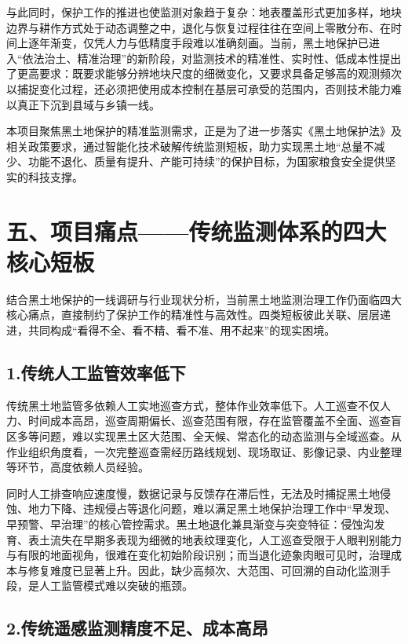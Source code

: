 \documentclass[12pt, a4paper]{ctexart}
\begin{document}
与此同时，保护工作的推进也使监测对象趋于复杂：地表覆盖形式更加多样，地块边界与耕作方式处于动态调整之中，退化与恢复过程往往在空间上零散分布、在时间上逐年渐变，仅凭人力与低精度手段难以准确刻画。当前，黑土地保护已进入“依法治土、精准治理”的新阶段，对监测技术的精准性、实时性、低成本性提出了更高要求：既要求能够分辨地块尺度的细微变化，又要求具备足够高的观测频次以捕捉变化过程，还必须把使用成本控制在基层可承受的范围内，否则技术能力难以真正下沉到县域与乡镇一线。

本项目聚焦黑土地保护的精准监测需求，正是为了进一步落实《黑土地保护法》及相关政策要求，通过智能化技术破解传统监测短板，助力实现黑土地“总量不减少、功能不退化、质量有提升、产能可持续”的保护目标，为国家粮食安全提供坚实的科技支撑。

\section{五、项目痛点——传统监测体系的四大核心短板}

结合黑土地保护的一线调研与行业现状分析，当前黑土地监测治理工作仍面临四大核心痛点，直接制约了保护工作的精准性与高效性。四类短板彼此关联、层层递进，共同构成“看得不全、看不精、看不准、用不起来”的现实困境。

\subsection{1.传统人工监管效率低下}

传统黑土地监管多依赖人工实地巡查方式，整体作业效率低下。人工巡查不仅人力、时间成本高昂，巡查周期偏长、巡查范围有限，存在监管覆盖不全面、巡查盲区多等问题，难以实现黑土区大范围、全天候、常态化的动态监测与全域巡查。从作业组织角度看，一次完整巡查需经历路线规划、现场取证、影像记录、内业整理等环节，高度依赖人员经验。

同时人工排查响应速度慢，数据记录与反馈存在滞后性，无法及时捕捉黑土地侵蚀、地力下降、违规侵占等退化问题，难以满足黑土地保护治理工作中“早发现、早预警、早治理”的核心管控需求。黑土地退化兼具渐变与突变特征：侵蚀沟发育、表土流失在早期多表现为细微的地表纹理变化，人工巡查受限于人眼判别能力与有限的地面视角，很难在变化初始阶段识别；而当退化迹象肉眼可见时，治理成本与修复难度已显著上升。因此，缺少高频次、大范围、可回溯的自动化监测手段，是人工监管模式难以突破的瓶颈。

\subsection{2.传统遥感监测精度不足、成本高昂}
\end{document}
